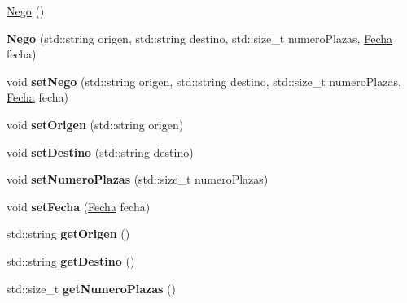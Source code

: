 \begin{DoxyCompactItemize}
\item 
\hyperlink{classNego_af997efc08cdc4e0fc654e6294ac4b08b}{Nego} ()
\item 
\hypertarget{classNego_a3c77023965a3ff3f8cf4666773adf2bb}{}{\bfseries Nego} (std\+::string origen, std\+::string destino, std\+::size\+\_\+t numero\+Plazas, \hyperlink{classFecha}{Fecha} fecha)\label{classNego_a3c77023965a3ff3f8cf4666773adf2bb}

\item 
\hypertarget{classNego_a8f471cb9fcf5127d5d7b52057241480e}{}void {\bfseries set\+Nego} (std\+::string origen, std\+::string destino, std\+::size\+\_\+t numero\+Plazas, \hyperlink{classFecha}{Fecha} fecha)\label{classNego_a8f471cb9fcf5127d5d7b52057241480e}

\item 
\hypertarget{classNego_ab9a55ac4fb4834dbede2806dbbcb62bb}{}void {\bfseries set\+Origen} (std\+::string origen)\label{classNego_ab9a55ac4fb4834dbede2806dbbcb62bb}

\item 
\hypertarget{classNego_a037842afd947e4f33de78ecb4ce0485c}{}void {\bfseries set\+Destino} (std\+::string destino)\label{classNego_a037842afd947e4f33de78ecb4ce0485c}

\item 
\hypertarget{classNego_a439b8b96071a63e3b7865b7e706412bf}{}void {\bfseries set\+Numero\+Plazas} (std\+::size\+\_\+t numero\+Plazas)\label{classNego_a439b8b96071a63e3b7865b7e706412bf}

\item 
\hypertarget{classNego_a8fd1c05283f046daab60ed330bac1795}{}void {\bfseries set\+Fecha} (\hyperlink{classFecha}{Fecha} fecha)\label{classNego_a8fd1c05283f046daab60ed330bac1795}

\item 
\hypertarget{classNego_a6be2088a392ae71ae25ff281e8432cc3}{}std\+::string {\bfseries get\+Origen} ()\label{classNego_a6be2088a392ae71ae25ff281e8432cc3}

\item 
\hypertarget{classNego_ade01b1e886a2b8e68152338a0ffd1240}{}std\+::string {\bfseries get\+Destino} ()\label{classNego_ade01b1e886a2b8e68152338a0ffd1240}

\item 
\hypertarget{classNego_af1816eb4bd3eba9cce2ea33d615b7d13}{}std\+::size\+\_\+t {\bfseries get\+Numero\+Plazas} ()\label{classNego_af1816eb4bd3eba9cce2ea33d615b7d13}


\end{DoxyCompactItemize}
